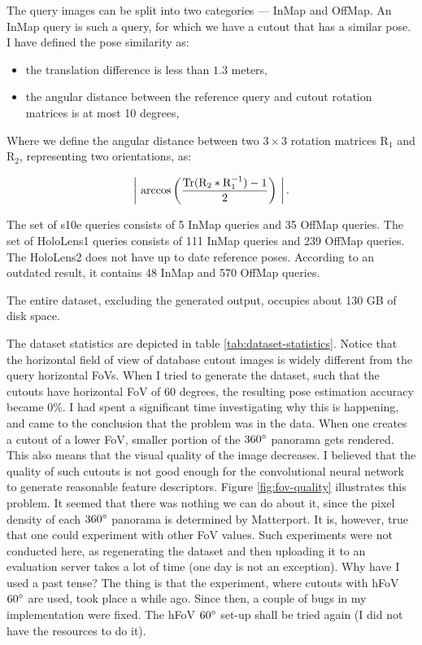 \documentclass[twoside]{ctuthesis}
\theoremstyle{plain}
\theoremstyle{definition}
\theoremstyle{note}
\begin{document}
The query images can be split into two categories --- InMap and OffMap. An InMap query is such a query, for which we have a cutout that has a similar pose. I have defined the pose similarity as:

\begin{itemize}
	\item the translation difference is less than $1.3$ meters,
	\item the angular distance between the reference query and cutout rotation matrices is at most 10 degrees,
\end{itemize}

Where we define the angular distance between two $3 \times 3$ rotation matrices $\text{R}_1$ and $\text{R}_2$, representing two orientations, as:

\begin{equation}
	\label{eq:rotation-distance}
	\left |~\arccos \left(\frac{\operatorname{Tr} (\text{R}_2 * \text{R}_1^{-1})-1}{2} \right)~\right|.
\end{equation}

The set of s10e queries consists of 5 InMap queries and 35 OffMap queries. The set of HoloLens1 queries consists of 111 InMap queries and 239 OffMap queries. The HoloLens2 does not have up to date reference poses. According to an outdated result, it contains 48 InMap and 570 OffMap queries.

The entire dataset, excluding the generated output, occupies about 130 GB of disk space.

The dataset statistics are depicted in table \ref{tab:dataset-statistics}. Notice that the horizontal field of view of database cutout images is widely different from the query horizontal FoVs. When I tried to generate the dataset, such that the cutouts have horizontal FoV of 60 degrees, the resulting pose estimation accuracy became 0\%. I had spent a significant time investigating why this is happening, and came to the conclusion that the problem was in the data. When one creates a cutout of a lower FoV, smaller portion of the $360\degree$ panorama gets rendered. This also means that the visual quality of the image decreases. I believed that the quality of such cutouts is not good enough for the convolutional neural network to generate reasonable feature descriptors. Figure \ref{fig:fov-quality} illustrates this problem. It seemed that there was nothing we can do about it, since the pixel density of each $360\degree$ panorama is determined by Matterport. It is, however, true that one could experiment with other FoV values. Such experiments were not conducted here, as regenerating the dataset and then uploading it to an evaluation server takes a lot of time (one day is not an exception). Why have I used a past tense? The thing is that the experiment, where cutouts with hFoV $60\degree$ are used, took place a while ago. Since then, a couple of bugs in my implementation were fixed. The hFoV $60\degree$ set-up shall be tried again (I did not have the resources to do it).
\end{document}
